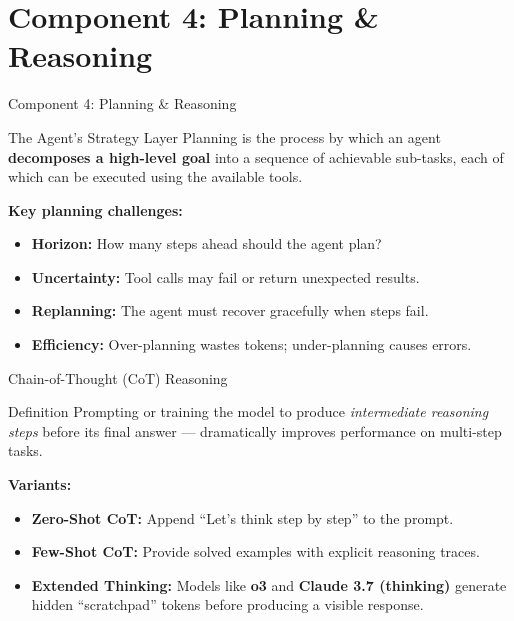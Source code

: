 \documentclass{beamer}       %
\begin{document}
\section{Component 4: Planning \& Reasoning}

\begin{frame}{Component 4: Planning \& Reasoning}
    \begin{block}{The Agent's Strategy Layer}
        Planning is the process by which an agent \textbf{decomposes a high-level goal} into a sequence of achievable sub-tasks, each of which can be executed using the available tools.
    \end{block}
    \vspace{0.2cm}
    \textbf{Key planning challenges:}
    \begin{itemize}
        \item \textbf{Horizon:} How many steps ahead should the agent plan?
        \item \textbf{Uncertainty:} Tool calls may fail or return unexpected results.
        \item \textbf{Replanning:} The agent must recover gracefully when steps fail.
        \item \textbf{Efficiency:} Over-planning wastes tokens; under-planning causes errors.
    \end{itemize}
\end{frame}

\begin{frame}{Chain-of-Thought (CoT) Reasoning}
    \begin{block}{Definition}
        Prompting or training the model to produce \emph{intermediate reasoning steps} before its final answer --- dramatically improves performance on multi-step tasks.
    \end{block}
    \vspace{0.2cm}
    \textbf{Variants:}
    \begin{itemize}
        \item \textbf{Zero-Shot CoT:} Append ``Let's think step by step'' to the prompt.
        \item \textbf{Few-Shot CoT:} Provide solved examples with explicit reasoning traces.
        \item \textbf{Extended Thinking:} Models like \textbf{o3} and \textbf{Claude 3.7 (thinking)} generate hidden ``scratchpad'' tokens before producing a visible response.
    \end{itemize}
\end{frame}
\end{document}
